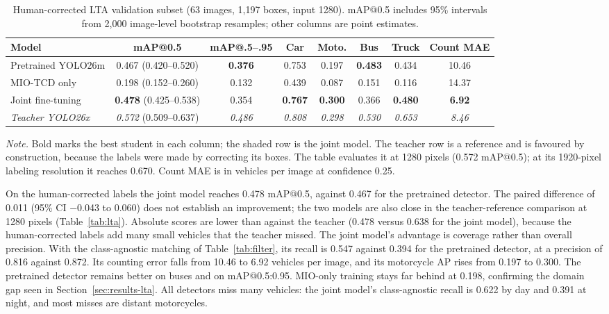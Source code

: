 \begin{table}[htbp]
  \centering
  \small
  \caption{Human-corrected LTA validation subset (63 images, 1,197 boxes, input 1280).
  mAP@0.5 includes 95\% intervals from 2,000 image-level bootstrap resamples;
  other columns are point estimates.}
  \label{tab:lta-human}
  \setlength{\tabcolsep}{3pt}
  \begin{tabular}{@{}lccccccc@{}}
    \toprule
    Model & mAP@0.5 & mAP@.5--.95 & Car & Moto. & Bus & Truck & Count MAE \\
    \midrule
    Pretrained YOLO26m & 0.467 (0.420--0.520) & \textbf{0.376} & 0.753 & 0.197 & \textbf{0.483} & 0.434 & 10.46 \\
    MIO-TCD only       & 0.198 (0.152--0.260) & 0.132 & 0.439 & 0.087 & 0.151 & 0.116 & 14.37 \\
    \rowcolor{oursrow}
    Joint fine-tuning  & \textbf{0.478} (0.425--0.538) & 0.354 & \textbf{0.767} & \textbf{0.300} & 0.366 & \textbf{0.480} & \textbf{6.92} \\
    \midrule
    \textit{Teacher YOLO26x} & \textit{0.572} (0.509--0.637) & \textit{0.486} & \textit{0.808} & \textit{0.298} & \textit{0.530} & \textit{0.653} & \textit{8.46} \\
    \bottomrule
  \end{tabular}
  \par\smallskip
  \begin{minipage}{\linewidth}\footnotesize
    \textit{Note.} Bold marks the best student in each column; the shaded row
    is the joint model. The teacher row is a reference and is favoured by
    construction, because the labels were made by correcting its boxes. The
    table evaluates it at 1280 pixels (0.572 mAP@0.5); at its 1920-pixel
    labeling resolution it reaches 0.670. Count MAE is in vehicles per image at
    confidence 0.25.
  \end{minipage}
\end{table}

On the human-corrected labels the joint model reaches 0.478 mAP@0.5, against 0.467 for the
pretrained detector. The paired difference of 0.011 (95\% CI −0.043 to
0.060) does not establish an improvement; the two models are also close in the
teacher-reference comparison at 1280 pixels (Table~\ref{tab:lta}). Absolute
scores are lower than against the teacher (0.478 versus 0.638 for the joint
model), because the human-corrected labels add many small vehicles that the teacher
missed. The joint model's advantage is coverage rather than overall precision.
With the class-agnostic matching of Table~\ref{tab:filter}, its recall is 0.547
against 0.394 for the pretrained detector, at a precision of 0.816 against
0.872. Its counting error falls from 10.46 to 6.92 vehicles per image, and its
motorcycle AP rises from 0.197 to 0.300. The pretrained detector remains better
on buses and on mAP@0.5:0.95. MIO-only training stays far behind at 0.198,
confirming the domain gap seen in Section~\ref{sec:results-lta}. All detectors
miss many vehicles: the joint model's class-agnostic recall is 0.622 by day and
0.391 at night, and most misses are distant motorcycles.

